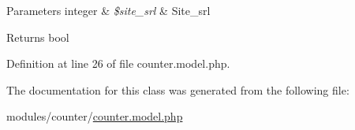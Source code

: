 \begin{DoxyParams}[1]{Parameters}
integer & {\em \$site\+\_\+srl} & Site\+\_\+srl \\
\hline
\end{DoxyParams}
\begin{DoxyReturn}{Returns}
bool 
\end{DoxyReturn}


Definition at line 26 of file counter.\+model.\+php.



The documentation for this class was generated from the following file\+:\begin{DoxyCompactItemize}
\item 
modules/counter/\hyperlink{counter_8model_8php}{counter.\+model.\+php}\end{DoxyCompactItemize}
